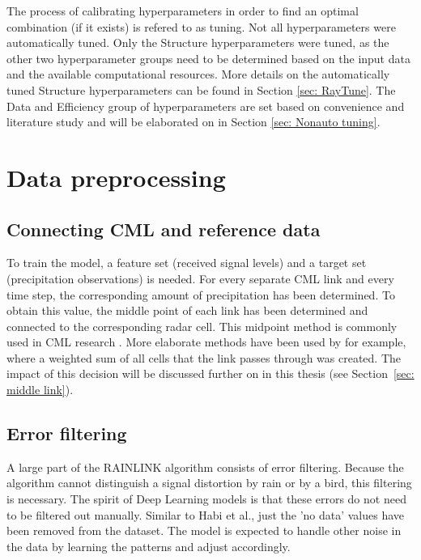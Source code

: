 \documentclass[twocolumn, 10pt, a4paper]{memoir}
\begin{document}
	The process of calibrating hyperparameters in order to find an optimal combination (if it exists) is refered to as tuning. Not all hyperparameters were automatically tuned. Only the Structure hyperparameters were tuned, as the other two hyperparameter groups need to be determined based on the input data and the available computational resources. More details on the automatically tuned Structure hyperparameters can be found in Section \ref{sec: RayTune}. The Data and Efficiency group of hyperparameters are set based on convenience and literature study and will be elaborated on in Section \ref{sec: Nonauto tuning}.
	
	
	\section{Data preprocessing} \label{sec: datapreprocess}
	\subsection{Connecting CML and reference data}
	To train the model, a feature set (received signal levels) and a target set (precipitation observations) is needed. For every separate CML link and every time step, the corresponding amount of precipitation has been determined. To obtain this value, the middle point of each link has been determined and connected to the corresponding radar cell. This midpoint method is commonly used in CML research \cite{Pudashine2020, Diba2021}. More elaborate methods have been used by  for example, where a weighted sum of all cells that the link passes through was created. The impact of this decision will be discussed further on in this thesis (see Section~\ref{sec: middle link}).
	\subsection{Error filtering}
	A large part of the RAINLINK algorithm consists of error filtering. Because the algorithm cannot distinguish a signal distortion by rain or by a bird, this filtering is necessary. The spirit of Deep Learning models is that these errors do not need to be filtered out manually. Similar to Habi et al., just the 'no data' values have been removed from the dataset. The model is expected to handle other noise in the data by learning the patterns and adjust accordingly.
\end{document}
